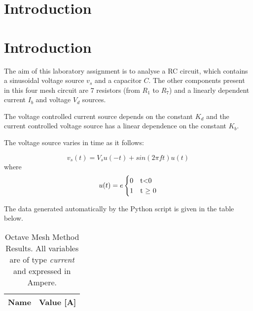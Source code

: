 \section{Introduction}
\label{introduction}


\section{Introduction}
\label{introduction}

\par The aim of this laboratory assignment is to analyse a RC circuit, which contains a sinusoidal voltage source $v_s$ and a capacitor $C$. The other components present in this four mesh circuit are 7 resistors (from $R_1$ to $R_7$) and a linearly dependent current $I_b$ and voltage $V_d$ sources.
\par The voltage controlled current source depends on the constant $K_d$ and the current controlled voltage source has a linear dependence on the constant $K_b$.

\par The voltage source varies in time as it follows:

\begin{equation}
	v_s(t) = V_s u(-t) + sin(2 \pi f t)u(t)
	\label {equation:n1}
\end{equation}
where
\begin{equation}
	u(t)=e
	\begin{cases}
		0 & $t$ < $0$ \\
		1 & $t $\geq$ 0$
	\end{cases}
	\label {eq:n2}
\end{equation}

\par The data generated automatically by the Python script is given in the table below.

\begin{table}[ht]
  \centering
  \begin{tabular}{|l|r|}
    \hline    
    {\bf Name} & {\bf Value [A]} \\ \hline
    
  \end{tabular}
  \caption{Octave Mesh Method Results. All variables are of type {\em current}
    and expressed in Ampere.}
  \label{tab:malhas}
\end{table}



